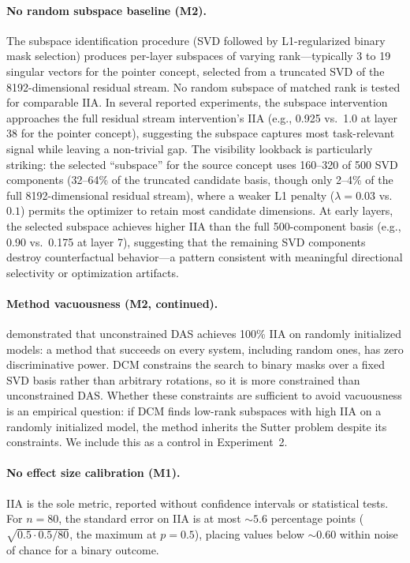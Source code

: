 \documentclass[11pt]{article}
\begin{document}
\paragraph{No random subspace baseline (M2).}
The subspace identification procedure (SVD followed by L1-regularized binary mask selection) produces per-layer subspaces of varying rank---typically 3 to 19 singular vectors for the pointer concept, selected from a truncated SVD of the 8192-dimensional residual stream. No random subspace of matched rank is tested for comparable IIA. In several reported experiments, the subspace intervention approaches the full residual stream intervention's IIA (e.g., 0.925 vs.\ 1.0 at layer 38 for the pointer concept), suggesting the subspace captures most task-relevant signal while leaving a non-trivial gap. The visibility lookback is particularly striking: the selected ``subspace'' for the source concept uses 160--320 of 500 SVD components (32--64\% of the truncated candidate basis, though only 2--4\% of the full 8192-dimensional residual stream), where a weaker L1 penalty ($\lambda = 0.03$ vs.\ $0.1$) permits the optimizer to retain most candidate dimensions. At early layers, the selected subspace achieves higher IIA than the full 500-component basis (e.g., 0.90 vs.\ 0.175 at layer 7), suggesting that the remaining SVD components destroy counterfactual behavior---a pattern consistent with meaningful directional selectivity or optimization artifacts.

\paragraph{Method vacuousness (M2, continued).}
\citet{sutter2025vacuous} demonstrated that unconstrained DAS achieves 100\% IIA on randomly initialized models: a method that succeeds on every system, including random ones, has zero discriminative power. DCM constrains the search to binary masks over a fixed SVD basis rather than arbitrary rotations, so it is more constrained than unconstrained DAS. Whether these constraints are sufficient to avoid vacuousness is an empirical question: if DCM finds low-rank subspaces with high IIA on a randomly initialized model, the method inherits the Sutter problem despite its constraints. We include this as a control in Experiment~2.

\paragraph{No effect size calibration (M1).}
IIA is the sole metric, reported without confidence intervals or statistical tests. For $n = 80$, the standard error on IIA is at most ${\sim}5.6$ percentage points ($\sqrt{0.5 \cdot 0.5 / 80}$, the maximum at $p = 0.5$), placing values below ${\sim}0.60$ within noise of chance for a binary outcome.
\end{document}
